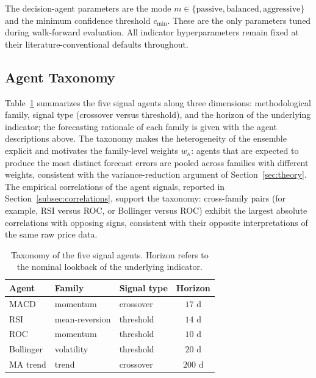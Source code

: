 \documentclass{ieeeaccess}
\begin{document}
The decision-agent parameters are the mode $m \in \{\text{passive}, \text{balanced}, \text{aggressive}\}$ and the minimum confidence threshold $c_{\min}$. These are the only parameters tuned during walk-forward evaluation. All indicator hyperparameters remain fixed at their literature-conventional defaults throughout.

\subsection{Agent Taxonomy}
\label{subsec:taxonomy}

Table~\ref{tab:taxonomy} summarizes the five signal agents along three dimensions: methodological family, signal type (crossover versus threshold), and the horizon of the underlying indicator; the forecasting rationale of each family is given with the agent descriptions above. The taxonomy makes the heterogeneity of the ensemble explicit and motivates the family-level weights $w_\kappa$: agents that are expected to produce the most distinct forecast errors are pooled across families with different weights, consistent with the variance-reduction argument of Section~\ref{sec:theory}. The empirical correlations of the agent signals, reported in Section~\ref{subsec:correlations}, support the taxonomy: cross-family pairs (for example, RSI versus ROC, or Bollinger versus ROC) exhibit the largest absolute correlations with opposing signs, consistent with their opposite interpretations of the same raw price data.

\begin{table}[t]
\centering
\caption{Taxonomy of the five signal agents. Horizon refers to the nominal lookback of the underlying indicator.}
\label{tab:taxonomy}
\begin{tabular}{lllc}
\toprule
Agent & Family & Signal type & Horizon \\
\midrule
MACD          & momentum       & crossover & $17$ d \\
RSI           & mean-reversion & threshold & $14$ d \\
ROC           & momentum       & threshold & $10$ d \\
Bollinger     & volatility     & threshold & $20$ d \\
MA trend      & trend          & crossover & $200$ d \\
\bottomrule
\end{tabular}
\end{table}

\end{document}
